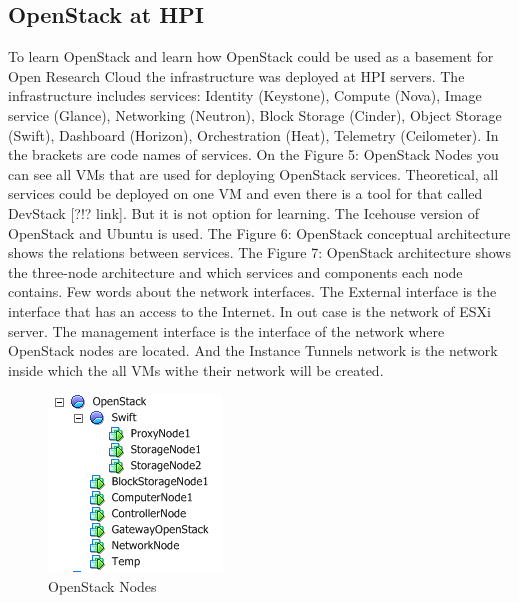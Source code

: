 \subsection{OpenStack at HPI}
To learn OpenStack and learn how OpenStack could be used as a basement for Open Research Cloud the infrastructure was deployed at HPI servers. The infrastructure includes services: Identity (Keystone), Compute (Nova), Image service (Glance), Networking (Neutron), Block Storage (Cinder), Object Storage (Swift), Dashboard (Horizon), Orchestration (Heat), Telemetry (Ceilometer). In the brackets are code names of services. On the Figure 5: OpenStack Nodes you can see all VMs that are used for deploying OpenStack services. Theoretical, all services could be deployed on one VM and even there is a tool for that called DevStack [?!? link]. But it is not option for  learning. The Icehouse version of OpenStack  and Ubuntu is used.  
The Figure 6: OpenStack conceptual architecture shows the relations between services. The Figure 7: OpenStack architecture shows the three-node architecture and which services and components each node contains. Few words about the network interfaces. The External interface is the interface that has an access to the Internet. In out case is the network of ESXi server. The management interface is the interface of the network where OpenStack nodes are located. And the Instance Tunnels network is the network inside which the all VMs withe their network will be created. 
\begin{figure}[ht!]
\centering
\includegraphics{openstack_tree.png}
\caption{OpenStack Nodes}
\label{overflow}
\end{figure}


